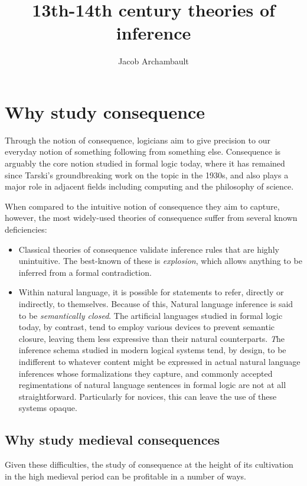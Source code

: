 \documentclass[]{article}
\title{13th-14th century theories of inference}
\author{Jacob Archambault}
\begin{document}
\maketitle

\section{Why study consequence}
Through the notion of consequence, logicians aim to give precision to our everyday notion of something following from something else. Consequence is arguably the core notion studied in formal logic today, where it has remained since Tarski's groundbreaking work on the topic in the 1930s, and also plays a major role in adjacent fields including computing and the philosophy of science. 

When compared to the intuitive notion of consequence they aim to capture, however, the most widely-used theories of consequence suffer from several known deficiencies: 
\begin{itemize}
	\item Classical theories of consequence validate inference rules that are highly unintuitive. The best-known of these is \emph{explosion}, which allows anything to be inferred from a formal contradiction.
	\item Within natural language, it is possible for statements to refer, directly or indirectly, to themselves. Because of this, Natural language inference is said to be \emph{semantically closed}. The artificial languages studied in formal logic today, by contrast, tend to employ various devices to prevent semantic closure, leaving them less expressive than their natural counterparts.
	\emph The inference schema studied in modern logical systems tend, by design, to be indifferent to whatever content might be expressed in actual natural language inferences whose formalizations they capture, and commonly accepted regimentations of natural language sentences in formal logic are not at all straightforward. Particularly for novices, this can leave the use of these systems opaque. 
\end{itemize}

\subsection{Why study medieval consequences}
Given these difficulties, the study of consequence at the height of its cultivation in the high medieval period can be profitable in a number of ways. 
\end{document}
